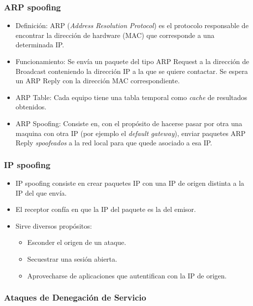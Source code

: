 \subsubsection{ARP spoofing}

\begin{itemize}
	\item Definición: ARP (\textit{Address Resolution Protocol}) es el protocolo responsable de encontrar
	la dirección de hardware (MAC) que corresponde a una determinada IP. 
	\item Funcionamiento: Se envía un paquete del tipo ARP Request a la dirección de Broadcast conteniendo la
	dirección IP a la que se quiere contactar. Se espera un ARP Reply con la dirección MAC correspondiente.
	\item ARP Table: Cada equipo tiene una tabla temporal como \textit{cache} de resultados obtenidos.
	\item ARP Spoofing: Consiste en, con el propósito de hacerse pasar por otra una maquina con otra IP (por ejemplo
	el \textit{default gateway}), enviar paquetes ARP Reply \textit{spoofeados} a la red local para que quede asociado
	a esa IP.
\end{itemize}

\subsubsection{IP spoofing}

\begin{itemize}
	\item IP spoofing consiste en crear paquetes IP con una IP de origen distinta a la IP del que envía.
	\item El receptor confía en que la IP del paquete es la del emisor.
	\item Sirve diversos propósitos:
		\begin{itemize}
			\item Esconder el origen de un ataque.
			\item Secuestrar una sesión abierta.
			\item Aprovecharse de aplicaciones que autentifican con la IP de origen.
		\end{itemize}
\end{itemize}

\subsubsection{Ataques de Denegación de Servicio}

